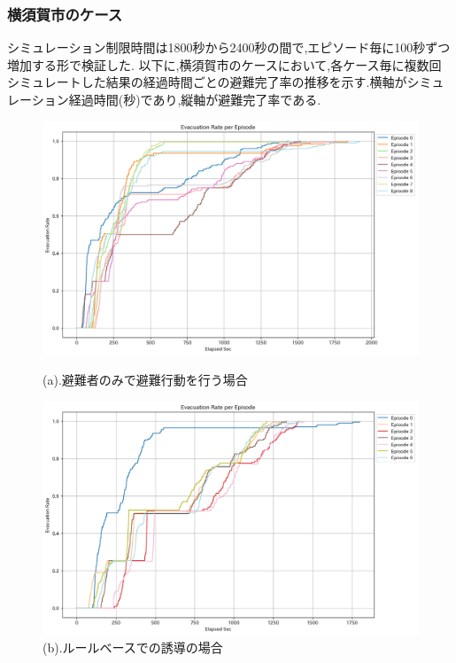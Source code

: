 \subsubsection{横須賀市のケース}
シミュレーション制限時間は1800秒から2400秒の間で,エピソード毎に100秒ずつ増加する形で検証した.
以下に,横須賀市のケースにおいて,各ケース毎に複数回シミュレートした結果の経過時間ごとの避難完了率の推移を示す.横軸がシミュレーション経過時間(秒)であり,縦軸が避難完了率である.
\begin{figure}[H]
  \centering
  \begin{minipage}{0.45\textwidth}
      \centering
      \includegraphics[width=\textwidth]{Figures/Yokosuka-EvaOnly-ERE.png} %
      \caption{(a).避難者のみで避難行動を行う場合}
      \label{fig:yokosuka-guid-graph-a}
  \end{minipage}
  \hfill %
  \begin{minipage}{0.45\textwidth}
      \centering
      \includegraphics[width=\textwidth]{Figures/Yokosuka-RuleModel-ERE.png} %
      \caption{(b).ルールベースでの誘導の場合}
      \label{fig:yokosuka-guidgraph-b}
  \end{minipage}
  

\end{figure}
